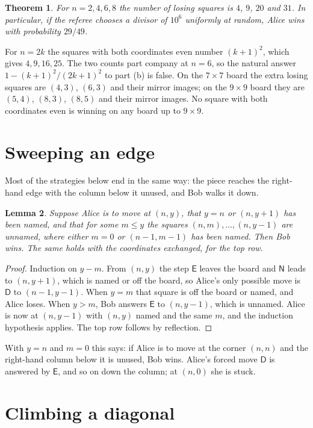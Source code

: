 \documentclass[11pt]{article}
\newtheorem{theorem}{Theorem}
\newtheorem{lemma}[theorem]{Lemma}
\theoremstyle{remark}
\newcommand{\E}{\mathsf{E}}
\newcommand{\N}{\mathsf{N}}
\newcommand{\D}{\mathsf{D}}
\begin{document}
\begin{theorem}\label{thm:counts}
For $n=2,4,6,8$ the number of losing squares is $4$, $9$, $20$ and $31$. In particular, if the
referee chooses a divisor of $10^6$ uniformly at random, Alice wins with probability $29/49$.
\end{theorem}

For $n=2k$ the squares with both coordinates even number $(k+1)^2$, which gives $4,9,16,25$.
The two counts part company at $n=6$, so the natural answer $1-(k+1)^2/(2k+1)^2$ to part (b) is
false. On the $7\times7$ board the extra losing squares are $(4,3)$, $(6,3)$ and their mirror
images; on the $9\times 9$ board they are $(5,4)$, $(8,3)$, $(8,5)$ and their mirror images.
No square with both coordinates even is winning on any board up to $9\times9$.

\section{Sweeping an edge}

Most of the strategies below end in the same way: the piece reaches the right-hand edge with the
column below it unused, and Bob walks it down.

\begin{lemma}\label{lem:sweep}
Suppose Alice is to move at $(n,y)$, that $y=n$ or $(n,y+1)$ has been named, and that for some
$m\le y$ the squares $(n,m),\dots,(n,y-1)$ are unnamed, where either $m=0$ or $(n-1,m-1)$ has been
named. Then Bob wins. The same holds with the coordinates exchanged, for the top row.
\end{lemma}

\begin{proof}
Induction on $y-m$. From $(n,y)$ the step $\E$ leaves the board and $\N$ leads to $(n,y+1)$,
which is named or off the board, so Alice's only possible move is $\D$ to $(n-1,y-1)$. When
$y=m$ that square is off the board or named, and Alice loses. When $y>m$, Bob answers $\E$ to
$(n,y-1)$, which is unnamed. Alice is now at $(n,y-1)$ with $(n,y)$ named and the same $m$, and
the induction hypothesis applies. The top row follows by reflection.
\end{proof}

With $y=n$ and $m=0$ this says: if Alice is to move at the corner $(n,n)$ and the right-hand
column below it is unused, Bob wins. Alice's forced move $\D$ is answered by $\E$, and so on down
the column; at $(n,0)$ she is stuck.

\section{Climbing a diagonal}
\end{document}
